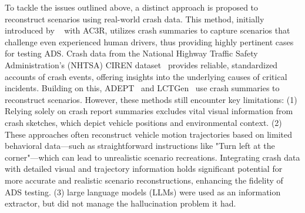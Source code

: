 
To tackle the issues outlined above, a distinct approach is proposed to reconstruct scenarios using real-world crash data. This method, initially introduced by ~\citet{gambi2019generating} with AC3R, utilizes crash summaries to capture scenarios that challenge even experienced human drivers, thus providing highly pertinent cases for testing ADS.
Crash data from the National Highway Traffic Safety Administration's (NHTSA) CIREN dataset~\cite{CIREN} provides reliable, standardized accounts of crash events, offering insights into the underlying causes of critical incidents. Building on this, ADEPT~\cite{wang2022adept} and LCTGen~\cite{tan2023language} use crash summaries to reconstruct scenarios. However, these methods still encounter key limitations: (1) Relying solely on crash report summaries excludes vital visual information from crash sketches, which depict vehicle positions and environmental context. (2) These approaches often reconstruct vehicle motion trajectories based on limited behavioral data—such as straightforward instructions like "Turn left at the corner"—which can lead to unrealistic scenario recreations. Integrating crash data with detailed visual and trajectory information holds significant potential for more accurate and realistic scenario reconstructions, enhancing the fidelity of ADS testing. (3) large language models (LLMs) were used as an information extractor, but did not manage the hallucination problem it had.

